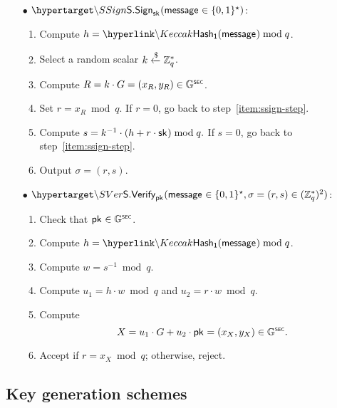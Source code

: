 \begin{mdframed}
	\begin{minipage}[t]{0.45\textwidth}
		\begin{itemize}
			\item[$\bullet$] $\hlset{\SSign}_{\sk}(\msg \in \{0,1\}^\star)$:  \vspace{0.1cm}
			\begin{enumerate}
				\item Compute $h = \hlget{\Keccak}(\msg) \bmod q$.
				\item\label{item:ssign-step} Select a random scalar $k \xleftarrow{\$} \mathbb{Z}_q^{*}$.
				\item Compute $R = k \cdot G = (x_R, y_R) \in {\ensuremath{\mathbb{G}}}^{\text{\tiny \sf SEC}}$.
				\item Set $r = x_R \bmod q$. If $r = 0$, go back to step~\ref{item:ssign-step}. 
				\item Compute $s = k^{-1} \cdot (h + r \cdot {\sf{sk}^{}}) \bmod q.$ If $s = 0$, go back to step~\ref{item:ssign-step}. 
				\item Output $\sigma = (r, s)$.
			\end{enumerate}
		\end{itemize}
	\end{minipage}
	\begin{minipage}[t]{0.54\textwidth}
		\begin{itemize}
			\item[$\bullet$] $\hlset{\SVer}_{\pk}(\msg \in \{0,1\}^\star, \sigma = (r, s)\in(\Z_q^*)^2)$: %
			\begin{enumerate}
				\item Check that ${\sf{pk}^{}} \in {\ensuremath{\mathbb{G}}}^{\text{\tiny \sf SEC}}$.
				\item Compute $h = \hlget{\Keccak}(\msg) \bmod q$.
				\item Compute $w = s^{-1} \bmod q$.
				\item Compute $u_1 = h \cdot w \bmod q$ and $u_2 = r \cdot w \bmod q$.
				\item Compute $$X = u_1 \cdot G + u_2 \cdot {\sf{pk}^{}} = (x_X, y_X) \in {\ensuremath{\mathbb{G}}}^{\text{\tiny \sf SEC}}.$$
				\item Accept if $r = x_X \bmod q$; otherwise, reject.
			\end{enumerate}
		\end{itemize}
	\end{minipage}
\end{mdframed}


\subsection{Key generation schemes}
\label{sec:cryptographic-primitives:dkg}

